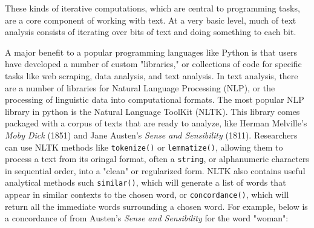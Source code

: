 \documentclass[11pt]{article}
\begin{document}
These kinds of iterative computations, which are central to
programming tasks, are a core component of working with text. At a
very basic level, much of text analysis consists of iterating over
bits of text and doing something to each bit. 

A major benefit to a popular programming languages like Python is that
users have developed a number of custom "libraries," or collections of
code for specific tasks like web scraping, data analysis, and text
analysis. In text analysis, there are a number of libraries for
Natural Language Processing (NLP), or the processing of linguistic
data into computational formats. The most popular NLP library in
python is the Natural Language ToolKit (NLTK). This library comes
packaged with a corpus of texts that are ready to analyze, like Herman
Melville's \emph{Moby Dick} (1851) and Jane Austen's \emph{Sense and
Sensibility} (1811). Researchers can use NLTK methods like
\texttt{tokenize()} or \texttt{lemmatize()}, allowing them to process a text from
its oringal format, often a \texttt{string}, or alphanumeric characters in
sequential order, into a "clean" or regularized form. NLTK also
contains useful analytical methods such \texttt{similar()}, which will
generate a list of words that appear in similar contexts to the chosen
word, or \texttt{concordance()}, which will return all the immediate words
surrounding a chosen word. For example, below is a concordance of from
Austen's \emph{Sense and Sensibility} for the word "woman":
\end{document}
